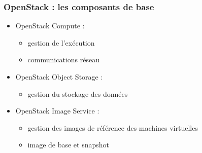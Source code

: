 \begin{frame}
  \frametitle{OpenStack : les composants de base}
  \begin{itemize}
  \item OpenStack Compute :
\begin{itemize}
\item gestion de l'exécution
\item communications réseau
\end{itemize}

  \item OpenStack Object Storage : \begin{itemize}
\item gestion du stockage des données
\end{itemize}

  \item OpenStack Image Service : \begin{itemize}
\item gestion des images de référence des machines virtuelles
\item image de base et snapshot
\end{itemize}

  \end{itemize}
\end{frame}



